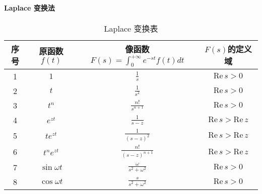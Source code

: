\paragraph{Laplace 变换法}

\begin{table*}[ht!]
    \vspace{1em}  %
    \renewcommand{\arraystretch}{2.5} %
    \caption{Laplace 变换表}
    \centering
    \begin{tabular}{c|c|c|c}
        \hline
        序号 & 原函数 $\displaystyle f(t)$                    & 像函数 $\displaystyle F(s)=\int_0^{+\infty} e^{-st}f(t)dt$                   & $\displaystyle F(s)$的定义域                      \\
        \hline
        1  & $\displaystyle 1$                           & $\displaystyle \frac{1}{s}$                                               & $\displaystyle \mathrm{Re}\,s>0$              \\
        \hline
        2  & $\displaystyle t$                           & $\displaystyle \frac{1}{s^2}$                                             & $\displaystyle \mathrm{Re}\,s>0$              \\
        \hline
        3  & $\displaystyle t^n$                         & $\displaystyle \frac{n!}{s^{n+1}}$                                        & $\displaystyle \mathrm{Re}\,s>0$              \\
        \hline
        4  & $\displaystyle e^{zt}$                      & $\displaystyle \frac{1}{s-z}$                                             & $\displaystyle \mathrm{Re}\,s>\mathrm{Re}\,z$ \\
        \hline
        5  & $\displaystyle te^{zt}$                     & $\displaystyle \frac{1}{(s-z)^2}$                                         & $\displaystyle \mathrm{Re}\,s>\mathrm{Re}\,z$ \\
        \hline
        6  & $\displaystyle t^ne^{zt}$                   & $\displaystyle \frac{n!}{(s-z)^{n+1}}$                                    & $\displaystyle \mathrm{Re}\,s>\mathrm{Re}\,z$ \\
        \hline
        7  & $\displaystyle \sin \omega t$               & $\displaystyle \frac{\omega}{s^2+\omega^2}$                               & $\displaystyle \mathrm{Re}\,s>0$              \\
        \hline
        8  & $\displaystyle \cos \omega t$               & $\displaystyle \frac{s}{s^2+\omega^2}$                                    & $\displaystyle \mathrm{Re}\,s>0$              \\

\end{tabular}
\end{table*}
